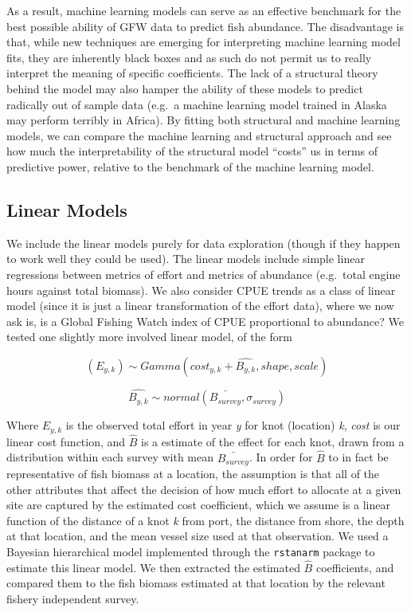 \documentclass[twoside,12pt,final]{ucthesis-CA2012}
\begin{document}
\begin{ucmainmatter}
As a result, machine learning models can serve as an effective benchmark
for the best possible ability of GFW data to predict fish abundance. The
disadvantage is that, while new techniques are emerging for interpreting
machine learning model fits, they are inherently black boxes and as such
do not permit us to really interpret the meaning of specific
coefficients. The lack of a structural theory behind the model may also
hamper the ability of these models to predict radically out of sample
data (e.g.~a machine learning model trained in Alaska may perform
terribly in Africa). By fitting both structural and machine learning
models, we can compare the machine learning and structural approach and
see how much the interpretability of the structural model ``costs'' us
in terms of predictive power, relative to the benchmark of the machine
learning model.

\subsection{Linear Models}\label{linear-models}

We include the linear models purely for data exploration (though if they
happen to work well they could be used). The linear models include
simple linear regressions between metrics of effort and metrics of
abundance (e.g.~total engine hours against total biomass). We also
consider CPUE trends as a class of linear model (since it is just a
linear transformation of the effort data), where we now ask is, is a
Global Fishing Watch index of CPUE proportional to abundance? We tested
one slightly more involved linear model, of the form

\[(E_{y,k}) \sim Gamma(cost_{y,k} + \hat{B_{y,k}}, shape, scale)\]

\[ \hat{B_{y,k}} \sim normal(\bar{B_{survey}}, \sigma_{survey})\]

Where \(E_{y,k}\) is the observed total effort in year \emph{y} for knot
(location) \emph{k}, \emph{cost} is our linear cost function, and
\(\hat{B}\) is a estimate of the effect for each knot, drawn from a
distribution within each survey with mean \(\bar{B_{survey}}\). In order
for \(\hat{B}\) to in fact be representative of fish biomass at a
location, the assumption is that all of the other attributes that affect
the decision of how much effort to allocate at a given site are captured
by the estimated cost coefficient, which we assume is a linear function
of the distance of a knot \emph{k} from port, the distance from shore,
the depth at that location, and the mean vessel size used at that
observation. We used a Bayesian hierarchical model implemented through
the \texttt{rstanarm} package to estimate this linear model. We then
extracted the estimated \(\hat{B}\) coefficients, and compared them to
the fish biomass estimated at that location by the relevant fishery
independent survey.


\end{ucmainmatter}
\end{document}

